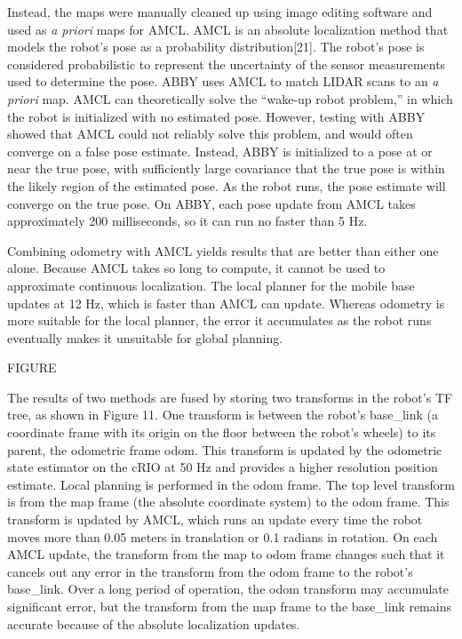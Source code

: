 \documentclass[]{cwru} %
\begin{document}
Instead, the maps were manually cleaned up using image editing software
and used as \emph{a priori} maps for AMCL. AMCL is an absolute
localization method that models the robot's pose as a probability
distribution{[}21{]}. The robot's pose is considered probabilistic to
represent the uncertainty of the sensor measurements used to determine
the pose. ABBY uses AMCL to match LIDAR scans to an \emph{a priori} map.
AMCL can theoretically solve the ``wake-up robot problem,'' in which the
robot is initialized with no estimated pose. However, testing with ABBY
showed that AMCL could not reliably solve this problem, and would often
converge on a false pose estimate. Instead, ABBY is initialized to a
pose at or near the true pose, with sufficiently large covariance that
the true pose is within the likely region of the estimated pose. As the
robot runs, the pose estimate will converge on the true pose. On ABBY,
each pose update from AMCL takes approximately 200 milliseconds, so it
can run no faster than 5 Hz.

Combining odometry with AMCL yields results that are better than either
one alone. Because AMCL takes so long to compute, it cannot be used to
approximate continuous localization. The local planner for the mobile
base updates at 12 Hz, which is faster than AMCL can update. Whereas
odometry is more suitable for the local planner, the error it
accumulates as the robot runs eventually makes it unsuitable for global
planning.

FIGURE

The results of two methods are fused by storing two transforms in the
robot's TF tree, as shown in Figure 11. One transform is between the
robot's base\_link (a coordinate frame with its origin on the floor
between the robot's wheels) to its parent, the odometric frame odom.
This transform is updated by the odometric state estimator on the cRIO
at 50 Hz and provides a higher resolution position estimate. Local
planning is performed in the odom frame. The top level transform is from
the map frame (the absolute coordinate system) to the odom frame. This
transform is updated by AMCL, which runs an update every time the robot
moves more than 0.05 meters in translation or 0.1 radians in rotation.
On each AMCL update, the transform from the map to odom frame changes
such that it cancels out any error in the transform from the odom frame
to the robot's base\_link. Over a long period of operation, the odom
transform may accumulate significant error, but the transform from the
map frame to the base\_link remains accurate because of the absolute
localization updates.
\end{document}
